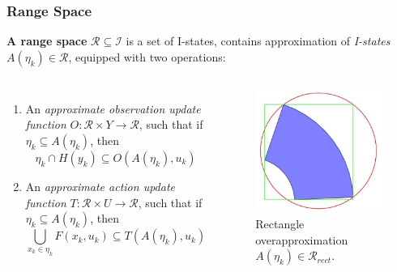 \documentclass[compress]{beamer}
\begin{document}
\begin{frame} \frametitle{Range Space}
\begin{definition}{\textbf{A range space}}
 $\mathcal{R} \subseteq \mathcal{I}$ is a set of I-states, contains
 approximation of \emph{I-states} $A(\eta_k) \in \mathcal{R}$, equipped with
 two operations:
\end{definition}
\begin{columns}
\begin{enumerate}
\item An \emph{approximate observation update function} $O: \mathcal{R} \times
		Y \to \mathcal{R}$, such that if $\eta_k \subseteq A(\eta_k)$, then
			$$\eta_k \cap H(y_k) \subseteq O(A(\eta_k), u_k)$$
\item An \emph{approximate action update function} $T: \mathcal{R} \times U \to
		\mathcal{R}$, such that if $\eta_k \subseteq A(\eta_k)$, then
			$$\bigcup_{x_k \in \eta_k} F(x_k, u_k) \subseteq T(A(\eta_k), u_k)$$
\end{enumerate}
    \begin{figure}
    \includegraphics[scale=0.3]{rangespace.jpg}
    \caption{Rectangle overapproximation $A(\eta_k) \in \mathcal{R}_{rect}$.}
    \end{figure}
\end{columns}
\end{frame}
\end{document}
